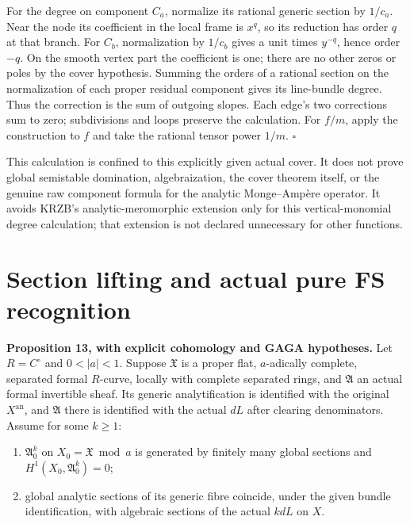 \documentclass[
  11pt,
]{article}
\providecommand{\tightlist}{%
  \setlength{\itemsep}{0pt}\setlength{\parskip}{0pt}}
\begin{document}
For the degree on component \(C_a\), normalize its rational generic
section by \(1/c_a\). Near the node its coefficient in the local frame
is \(x^q\), so its reduction has order \(q\) at that branch. For
\(C_b\), normalization by \(1/c_b\) gives a unit times \(y^{-q}\), hence
order \(-q\). On the smooth vertex part the coefficient is one; there
are no other zeros or poles by the cover hypothesis. Summing the orders
of a rational section on the normalization of each proper residual
component gives its line-bundle degree. Thus the correction is the sum
of outgoing slopes. Each edge's two corrections sum to zero;
subdivisions and loops preserve the calculation. For \(f/m\), apply the
construction to \(f\) and take the rational tensor power \(1/m\).
\(\square\)

This calculation is confined to this explicitly given actual cover. It
does not prove global semistable domination, algebraization, the cover
theorem itself, or the genuine raw component formula for the analytic
Monge--Ampère operator. It avoids KRZB's analytic-meromorphic extension
only for this vertical-monomial degree calculation; that extension is
not declared unnecessary for other functions.

\section{Section lifting and actual pure FS
recognition}\label{section-lifting-and-actual-pure-fs-recognition}

\textbf{Proposition 13, with explicit cohomology and GAGA hypotheses.}
Let \(R=C^\circ\) and \(0<|a|<1\). Suppose \(\mathfrak X\) is a proper
flat, \(a\)-adically complete, separated formal \(R\)-curve, locally
with complete separated rings, and \(\mathfrak A\) an actual formal
invertible sheaf. Its generic analytification is identified with the
original \(X^{\mathrm{an}}\), and \(\mathfrak A\) there is identified
with the actual \(dL\) after clearing denominators. Assume for some
\(k\geq1\):

\begin{enumerate}
\def\labelenumi{\arabic{enumi}.}
\tightlist
\item
  \(\mathfrak A_0^k\) on \(X_0=\mathfrak X\bmod a\) is generated by
  finitely many global sections and \(H^1(X_0,\mathfrak A_0^k)=0\);
\item
  global analytic sections of its generic fibre coincide, under the
  given bundle identification, with algebraic sections of the actual
  \(kdL\) on \(X\).
\end{enumerate}
\end{document}

